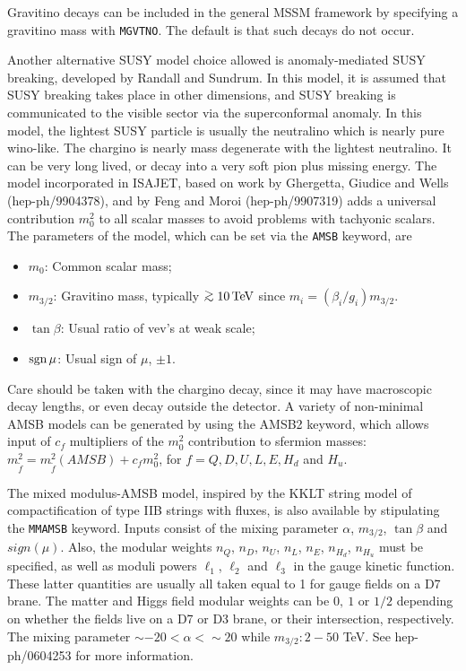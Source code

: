       Gravitino decays can be included in the general MSSM framework by
specifying a gravitino mass with \verb|MGVTNO|. The default is that such
decays do not occur.

\medskip

     Another alternative SUSY model choice allowed is anomaly-mediated
SUSY breaking, developed by Randall and Sundrum.  In this model, it is
assumed that SUSY breaking takes place in other dimensions, and SUSY
breaking is communicated to the visible sector via the superconformal
anomaly. In this model, the lightest SUSY particle is usually the
neutralino which is nearly pure wino-like. The chargino is nearly mass
degenerate with the lightest neutralino. It can be very long lived, or
decay into a very soft pion plus missing energy.  The model incorporated
in ISAJET, based on work by Ghergetta, Giudice and Wells
(hep-ph/9904378), and by Feng and Moroi (hep-ph/9907319) adds a
universal contribution $m_0^2$ to all scalar masses to avoid problems
with tachyonic scalars. The parameters of the model, which can be set
via the \verb|AMSB| keyword, are
\begin{itemize}
\item	$m_0$: Common scalar mass;
\item 	$m_{3/2}$: Gravitino mass, typically $\simge 10\,{\rm TeV}$ since 
$m_i = (\beta_i/g_i) m_{3/2}$.
\item	$\tan\beta$: Usual ratio of vev's at weak scale;
\item	$\mathop{\rm sgn}\mu$: Usual sign of $\mu$, $\pm1$.
\end{itemize}
Care should be taken with the chargino decay, since it may have
macroscopic decay lengths, or even decay outside the detector.
A variety of non-minimal AMSB models can be generated by using the
AMSB2 keyword, which allows input of $c_f$ multipliers of 
the $m_0^2$ contribution to 
sfermion masses: $m_{\tilde f}^2=m_{\tilde f}^2(AMSB)+c_f m_0^2$, 
for $f=Q,D,U,L,E,H_d$ and $H_u$.

The mixed modulus-AMSB model, inspired by the KKLT string model of
compactification of type IIB strings with fluxes, 
is also available by stipulating the 
\verb|MMAMSB| keyword. Inputs consist of the mixing parameter $\alpha$,
$m_{3/2}$, $\tan\beta$ and $sign(\mu )$. Also, the modular weights
$n_Q$, $n_D$, $n_U$, $n_L$, $n_E$, $n_{H_d}$, $n_{H_u}$ must be specified,
as well as moduli powers $\ell_1$, $\ell_2$ and $\ell_3$ in the 
gauge kinetic function. These latter quantities are usually all 
taken equal to 1 for gauge fields on a D7 brane. The matter and Higgs field
modular weights can be $0,\ 1$ or $1/2$ depending on whether the 
fields live on a D7 or D3 brane, or their intersection, respectively.
The mixing parameter $\sim -20<\alpha < \sim 20$ while $m_{3/2}:2-50$ TeV.
See hep-ph/0604253 for more information.

